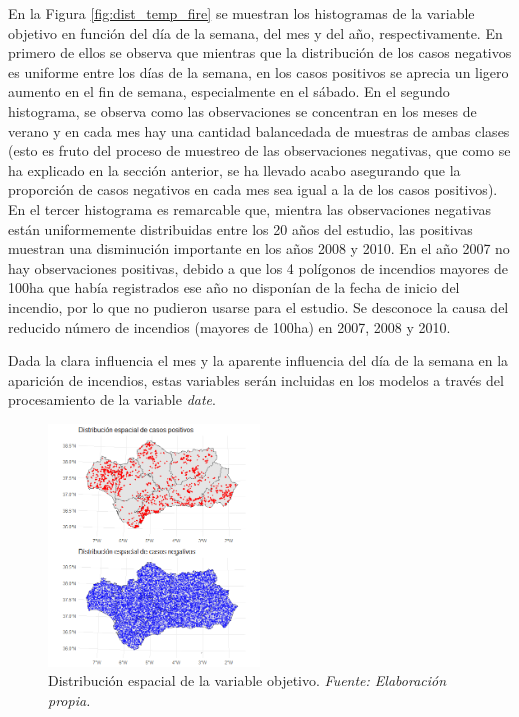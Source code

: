 \documentclass[12pt,a4paper,]{book}
\numberwithin{dummy}{section}
\theoremstyle{ocrenumbox}
\theoremstyle{blacknumex}
\theoremstyle{blacknumbox}
\theoremstyle{ocrenum}
\theoremstyle{ocrenum}
\begin{document}
En la Figura \ref{fig:dist_temp_fire} se muestran los histogramas de la
variable objetivo en función del día de la semana, del mes y del año,
respectivamente. En primero de ellos se observa que mientras que la
distribución de los casos negativos es uniforme entre los días de la
semana, en los casos positivos se aprecia un ligero aumento en el fin de
semana, especialmente en el sábado. En el segundo histograma, se observa
como las observaciones se concentran en los meses de verano y en cada
mes hay una cantidad balancedada de muestras de ambas clases (esto es
fruto del proceso de muestreo de las observaciones negativas, que como
se ha explicado en la sección anterior, se ha llevado acabo asegurando
que la proporción de casos negativos en cada mes sea igual a la de los
casos positivos). En el tercer histograma es remarcable que, mientra las
observaciones negativas están uniformemente distribuidas entre los 20
años del estudio, las positivas muestran una disminución importante en
los años 2008 y 2010. En el año 2007 no hay observaciones positivas,
debido a que los 4 polígonos de incendios mayores de 100ha que había
registrados ese año no disponían de la fecha de inicio del incendio, por
lo que no pudieron usarse para el estudio. Se desconoce la causa del
reducido número de incendios (mayores de 100ha) en 2007, 2008 y 2010.

Dada la clara influencia el mes y la aparente influencia del día de la
semana en la aparición de incendios, estas variables serán incluidas en
los modelos a través del procesamiento de la variable \emph{date}.

\begin{figure}[h]
\centering
\includegraphics[width = 0.5\textwidth]{graficos/distribucion_espacial_fire.png}
\caption{Distribución espacial de la variable objetivo. \it Fuente: Elaboración propia.}
\label{fig:dist_spat_fire}
\end{figure}
\end{document}
